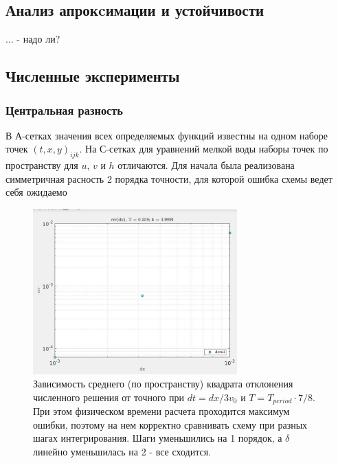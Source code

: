 \documentclass[a4paper,12pt]{article} %
\begin{document}
\subsection{Анализ апрокcимации и устойчивости}
... - надо ли?

\subsection{Численные эксперименты}

\subsubsection{Центральная разность}

В А-сетках значения всех определяемых функций известны на одном наборе точек $(t,x,y)_{ijk}$. На С-сетках для уравнений мелкой воды наборы точек по пространству для $u$, $v$ и $h$ отличаются. Для начала была реализована симметричная расность 2 порядка точности, для которой ошибка схемы ведет себя ожидаемо

\begin{figure}[h!]
\begin{center}
\includegraphics[width=0.7\textwidth]{./pics/Ctype_nErr}
\end{center}
\caption{Зависимость среднего (по пространству) квадрата отклонения численного решения от точного при $dt = dx/3v_0$ и $T = T_{period} \cdot 7/8$. При этом физическом времени расчета проходится максимум ошибки, поэтому на нем корректно сравнивать схему при разных шагах интегрирования. Шаги уменьшились на 1 порядок, а $\delta$ линейно уменьшилась на 2 - все сходится.} \label{img:Atype_nErr}
\end{figure}
\end{document}
